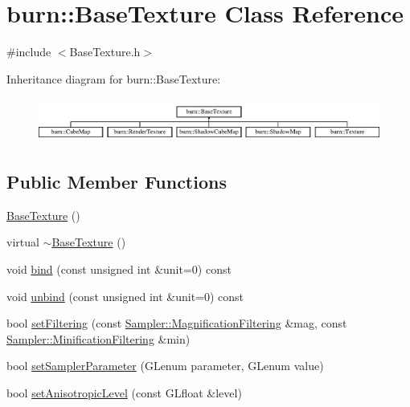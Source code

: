 \hypertarget{classburn_1_1_base_texture}{\section{burn\-:\-:Base\-Texture Class Reference}
\label{classburn_1_1_base_texture}
}


{\ttfamily \#include $<$Base\-Texture.\-h$>$}

Inheritance diagram for burn\-:\-:Base\-Texture\-:\begin{figure}[H]
\begin{center}
\leavevmode
\includegraphics[height=1.473684cm]{classburn_1_1_base_texture}
\end{center}
\end{figure}
\subsection*{Public Member Functions}
\begin{DoxyCompactItemize}
\item 
\hyperlink{classburn_1_1_base_texture_a7aaaf6a1bd92d7efbf924255f10d31ad}{Base\-Texture} ()
\item 
virtual \hyperlink{classburn_1_1_base_texture_a054138cc6815ce69a61d9a3562f40a97}{$\sim$\-Base\-Texture} ()
\item 
void \hyperlink{classburn_1_1_base_texture_a9666922b751e64ecf0c802309ba59f76}{bind} (const unsigned int \&unit=0) const 
\item 
void \hyperlink{classburn_1_1_base_texture_abc2944e64bdf5fe678db0e19b69151c4}{unbind} (const unsigned int \&unit=0) const 
\item 
bool \hyperlink{classburn_1_1_base_texture_afacc4aec15130a7b9b938bb7e8af1b07}{set\-Filtering} (const \hyperlink{classburn_1_1_sampler_a09433eae16f8623591d415a3f8c6afec}{Sampler\-::\-Magnification\-Filtering} \&mag, const \hyperlink{classburn_1_1_sampler_a09d6e36f45577a56ce230549aeaaab10}{Sampler\-::\-Minification\-Filtering} \&min)
\item 
bool \hyperlink{classburn_1_1_base_texture_acc07ff83e953a842ed65576ccc8a30e5}{set\-Sampler\-Parameter} (G\-Lenum parameter, G\-Lenum value)
\item 
bool \hyperlink{classburn_1_1_base_texture_a7b1590c284aa57ce7776eb294abd75ae}{set\-Anisotropic\-Level} (const G\-Lfloat \&level)
\end{DoxyCompactItemize}

